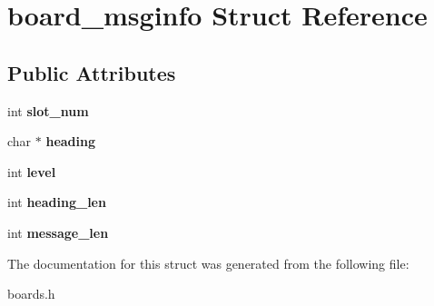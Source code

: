 \hypertarget{structboard__msginfo}{}\section{board\+\_\+msginfo Struct Reference}
\label{structboard__msginfo}
\subsection*{Public Attributes}
\begin{DoxyCompactItemize}
\item 
\mbox{\label{structboard__msginfo_a1dee889a66d5a2bc21b12184df2a6422}} 
int {\bfseries slot\+\_\+num}
\item 
\mbox{\label{structboard__msginfo_a89b7048fcd00f982ec657cc1e7334164}} 
char $\ast$ {\bfseries heading}
\item 
\mbox{\label{structboard__msginfo_a9aa2bc358f07c92298f7063c6dc24906}} 
int {\bfseries level}
\item 
\mbox{\label{structboard__msginfo_a08e9636916e883a52c20e77d8a753021}} 
int {\bfseries heading\+\_\+len}
\item 
\mbox{\label{structboard__msginfo_a9c488b22917be2589226093860a70d0f}} 
int {\bfseries message\+\_\+len}
\end{DoxyCompactItemize}


The documentation for this struct was generated from the following file\+:\begin{DoxyCompactItemize}
\item 
boards.\+h\end{DoxyCompactItemize}
